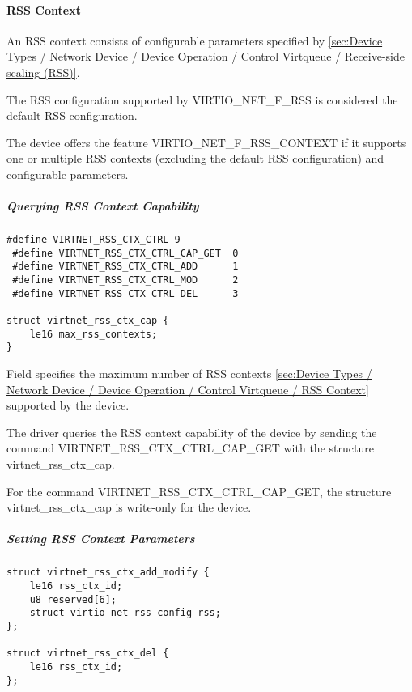 \paragraph{RSS Context}\label{sec:Device Types / Network Device / Device Operation / Control Virtqueue / RSS Context}

An RSS context consists of configurable parameters specified by \ref{sec:Device Types / Network Device
/ Device Operation / Control Virtqueue / Receive-side scaling (RSS)}.

The RSS configuration supported by VIRTIO_NET_F_RSS is considered the default RSS configuration.

The device offers the feature VIRTIO_NET_F_RSS_CONTEXT if it supports one or multiple RSS contexts
(excluding the default RSS configuration) and configurable parameters.

\subparagraph{Querying RSS Context Capability}\label{sec:Device Types / Network Device / Device Operation / Control Virtqueue / RSS Context / Querying RSS Context Capability}

\begin{lstlisting}
#define VIRTNET_RSS_CTX_CTRL 9
 #define VIRTNET_RSS_CTX_CTRL_CAP_GET  0
 #define VIRTNET_RSS_CTX_CTRL_ADD      1
 #define VIRTNET_RSS_CTX_CTRL_MOD      2
 #define VIRTNET_RSS_CTX_CTRL_DEL      3

struct virtnet_rss_ctx_cap {
    le16 max_rss_contexts;
}
\end{lstlisting}

Field  specifies the maximum number of RSS contexts \ref{sec:Device Types / Network Device /
Device Operation / Control Virtqueue / RSS Context} supported by the device.

The driver queries the RSS context capability of the device by sending the command VIRTNET_RSS_CTX_CTRL_CAP_GET
with the structure virtnet_rss_ctx_cap.

For the command VIRTNET_RSS_CTX_CTRL_CAP_GET, the structure virtnet_rss_ctx_cap is write-only for the device.

\subparagraph{Setting RSS Context Parameters}\label{sec:Device Types / Network Device / Device Operation / Control Virtqueue / RSS Context / Setting RSS Context Parameters}

\begin{lstlisting}
struct virtnet_rss_ctx_add_modify {
    le16 rss_ctx_id;
    u8 reserved[6];
    struct virtio_net_rss_config rss;
};

struct virtnet_rss_ctx_del {
    le16 rss_ctx_id;
};
\end{lstlisting}

